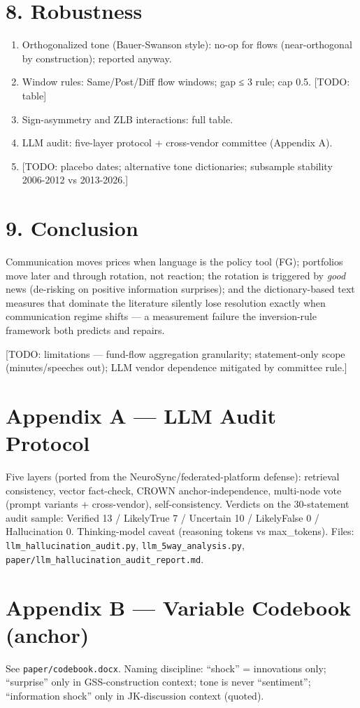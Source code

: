 \section{8. Robustness}\label{robustness}

\begin{enumerate}
\def\labelenumi{\arabic{enumi}.}
\tightlist
\item
  Orthogonalized tone (Bauer-Swanson style): no-op for flows (near-orthogonal by construction); reported anyway.
\item
  Window rules: Same/Post/Diff flow windows; gap ≤ 3 rule; cap 0.5. {[}TODO: table{]}
\item
  Sign-asymmetry and ZLB interactions: full table.
\item
  LLM audit: five-layer protocol + cross-vendor committee (Appendix A).
\item
  {[}TODO: placebo dates; alternative tone dictionaries; subsample stability 2006-2012 vs 2013-2026.{]}
\end{enumerate}

\section{9. Conclusion}\label{conclusion}

Communication moves prices when language is the policy tool (FG); portfolios move later and through rotation, not reaction; the rotation is triggered by \emph{good} news (de-risking on positive information surprises); and the dictionary-based text measures that dominate the literature silently lose resolution exactly when communication regime shifts --- a measurement failure the inversion-rule framework both predicts and repairs.

{[}TODO: limitations --- fund-flow aggregation granularity; statement-only scope (minutes/speeches out); LLM vendor dependence mitigated by committee rule.{]}

\section{Appendix A --- LLM Audit Protocol}\label{appendix-a-llm-audit-protocol}

Five layers (ported from the NeuroSync/federated-platform defense): retrieval consistency, vector fact-check, CROWN anchor-independence, multi-node vote (prompt variants + cross-vendor), self-consistency. Verdicts on the 30-statement audit sample: Verified 13 / LikelyTrue 7 / Uncertain 10 / LikelyFalse 0 / Hallucination 0. Thinking-model caveat (reasoning tokens vs max\_tokens). Files: \texttt{llm\_hallucination\_audit.py}, \texttt{llm\_5way\_analysis.py}, \texttt{paper/llm\_hallucination\_audit\_report.md}.

\section{Appendix B --- Variable Codebook (anchor)}\label{appendix-b-variable-codebook-anchor}

See \texttt{paper/codebook.docx}. Naming discipline: ``shock'' = innovations only; ``surprise'' only in GSS-construction context; tone is never ``sentiment''; ``information shock'' only in JK-discussion context (quoted).
